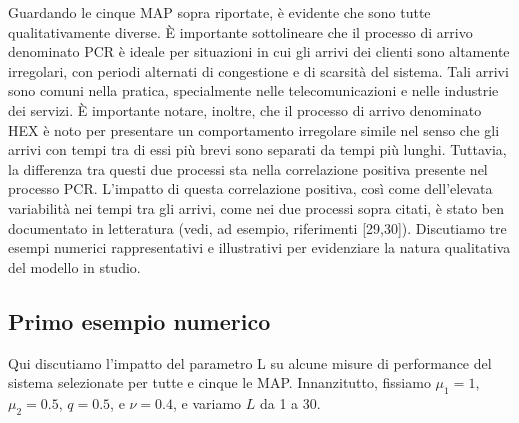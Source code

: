 \documentclass[11pt]{article}
\begin{document}
Guardando le cinque MAP sopra riportate, è evidente che sono tutte qualitativamente diverse. È importante sottolineare che il processo di arrivo denominato PCR è ideale per situazioni in cui gli arrivi dei clienti sono altamente irregolari, con periodi alternati di congestione e di scarsità del sistema. Tali arrivi sono comuni nella pratica, specialmente nelle telecomunicazioni e nelle industrie dei servizi. È importante notare, inoltre, che il processo di arrivo denominato HEX è noto per presentare un comportamento irregolare simile nel senso che gli arrivi con tempi tra di essi più brevi sono separati da tempi più lunghi. Tuttavia, la differenza tra questi due processi sta nella correlazione positiva presente nel processo PCR. L'impatto di questa correlazione positiva, così come dell'elevata variabilità nei tempi tra gli arrivi, come nei due processi sopra citati, è stato ben documentato in letteratura (vedi, ad esempio, riferimenti [29,30]). Discutiamo tre esempi numerici rappresentativi e illustrativi per evidenziare la natura qualitativa del modello in studio.

\subsection{Primo esempio numerico}
Qui discutiamo l'impatto del parametro L su alcune misure di performance del sistema selezionate per tutte e cinque le MAP. Innanzitutto, fissiamo $\mu_1=1$, $\mu_2=0.5$, $q=0.5$, e $\nu=0.4$, e variamo $L$ da 1 a 30.
\end{document}
